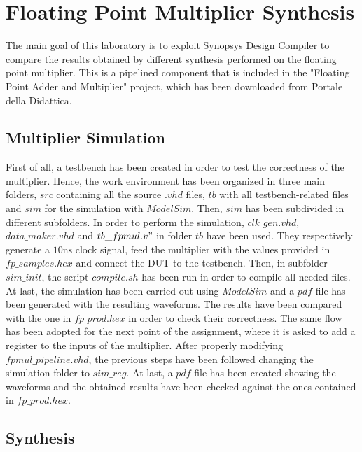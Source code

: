 \chapter{Floating Point Multiplier Synthesis}
\label{chap1}

The main goal of this laboratory is to exploit Synopsys Design Compiler to compare the results obtained by different synthesis performed on the floating point multiplier. This is a pipelined component that is included in the "Floating Point Adder and Multiplier" project, which has been downloaded from Portale della Didattica.

\section{Multiplier Simulation}

First of all, a testbench has been created in order to test the correctness of the multiplier. Hence, the work environment has been organized in three main folders, $src$ containing all the source $.vhd$ files, $tb$ with all testbench-related files and $sim$ for the simulation with $ModelSim$. Then, $sim$ has been subdivided in different subfolders. In order to perform the simulation, $clk\_gen.vhd$, $data\_maker.vhd$ and $tb\_fpmul.v"$ in folder $tb$ have been used. They respectively generate a $10\si{\nano\second}$ clock signal, feed the multiplier with the values provided in $fp\_samples.hex$ and connect the DUT to the testbench. Then, in subfolder $sim\_init$, the script $compile.sh$ has been run in order to compile all needed files. At last, the simulation has been carried out using $ModelSim$ and a $pdf$ file has been generated with the resulting waveforms. The results have been compared with the one in $fp\_prod.hex$ in order to check their correctness.
\newline
\newline
\noindent The same flow has been adopted for the next point of the assignment, where it is asked to add a register to the inputs of the multiplier. After properly modifying $fpmul\_pipeline.vhd$, the previous steps have been followed changing the simulation folder to $sim\_reg$. At last, a $pdf$ file has been created showing the waveforms and the obtained results have been checked against the ones contained in $fp\_prod.hex$.

\section{Synthesis}

